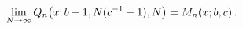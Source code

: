 \[\lim_{N\to\infty}\mathop{Q_{n}\/}\nolimits\!\left(x;b-1,N(c^{-1}-1),N\right)=%
\mathop{M_{n}\/}\nolimits\!\left(x;b,c\right).\]